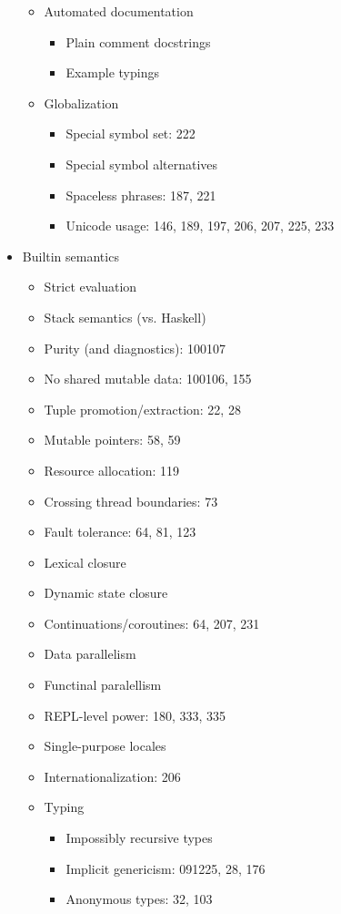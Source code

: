 \begin{itemize}
\begin{itemize}
  \item Automated documentation
    \begin{itemize}
    \item Plain comment docstrings
    \item Example typings
    \end{itemize}
  \item Globalization
    \begin{itemize}
    \item Special symbol set: 222
    \item Special symbol alternatives
    \item Spaceless phrases: 187, 221
    \item Unicode usage: 146, 189, 197, 206, 207, 225, 233
    \end{itemize}
  \end{itemize}
\item Builtin semantics
  \begin{itemize}
  \item Strict evaluation
  \item Stack semantics (vs. Haskell)
  \item Purity (and diagnostics): 100107
  \item No shared mutable data: 100106, 155
  \item Tuple promotion/extraction: 22, 28
  \item Mutable pointers: 58, 59
  \item Resource allocation: 119
  \item Crossing thread boundaries: 73
  \item Fault tolerance: 64, 81, 123
  \item Lexical closure
  \item Dynamic state closure
  \item Continuations/coroutines: 64, 207, 231
  \item Data parallelism
  \item Functinal paralellism
  \item REPL-level power: 180, 333, 335
  \item Single-purpose locales
  \item Internationalization: 206
  \item Typing
    \begin{itemize}
    \item Impossibly recursive types
    \item Implicit genericism: 091225, 28, 176
    \item Anonymous types: 32, 103

\end{itemize}
\end{itemize}
\end{itemize}
